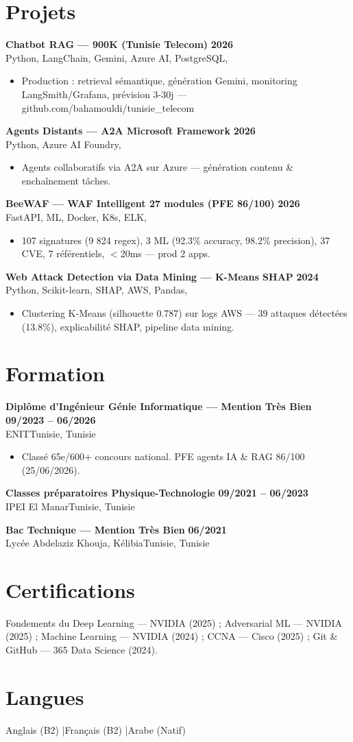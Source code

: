 \documentclass[a4paper,10pt]{article}
\newcommand{\cventry}[4]{\textbf{#1} \hfill \textbf{#4}\\[1pt]#2{\ifx\relax#3\relax\else, #3\fi}\par\vspace{2pt}}
\begin{document}
\section{Projets}
\cventry{Chatbot RAG — 900K (Tunisie Telecom)}{Python, LangChain, Gemini, Azure AI, PostgreSQL}{}{2026}
\begin{itemize}
  \item Production : retrieval sémantique, génération Gemini, monitoring LangSmith/Grafana, prévision 3-30j — github.com/bahamouldi/tunisie\_telecom
\end{itemize}
\cventry{Agents Distants — A2A Microsoft Framework}{Python, Azure AI Foundry}{}{2026}
\begin{itemize}
  \item Agents collaboratifs via A2A sur Azure — génération contenu \& enchaînement tâches.
\end{itemize}
\cventry{BeeWAF — WAF Intelligent 27 modules (PFE 86/100)}{FastAPI, ML, Docker, K8s, ELK}{}{2026}
\begin{itemize}
  \item 107 signatures (9 824 regex), 3 ML (92.3\% accuracy, 98.2\% precision), 37 CVE, 7 référentiels, $<$20ms — prod 2 apps.
\end{itemize}
\cventry{Web Attack Detection via Data Mining — K-Means SHAP}{Python, Scikit-learn, SHAP, AWS, Pandas}{}{2024}
\begin{itemize}
  \item Clustering K-Means (silhouette 0.787) sur logs AWS — 39 attaques détectées (13.8\%), explicabilité SHAP, pipeline data mining.
\end{itemize}

\section{Formation}
\cventry{Diplôme d'Ingénieur Génie Informatique — Mention Très Bien}{ENIT}{Tunisie}{09/2023 -- 06/2026}
\begin{itemize}
  \item Classé 65e/600+ concours national. PFE agents IA \& RAG 86/100 (25/06/2026).
\end{itemize}
\cventry{Classes préparatoires Physique-Technologie}{IPEI El Manar}{Tunisie}{09/2021 -- 06/2023}
\cventry{Bac Technique — Mention Très Bien}{Lycée Abdelaziz Khouja, Kélibia}{Tunisie}{06/2021}

\section{Certifications}
Fondements du Deep Learning — NVIDIA (2025) ; Adversarial ML — NVIDIA (2025) ; Machine Learning — NVIDIA (2024) ; CCNA — Cisco (2025) ; Git \& GitHub — 365 Data Science (2024).

\section{Langues}
Anglais (B2) \quad|\quad Français (B2) \quad|\quad Arabe (Natif)
\end{document}
